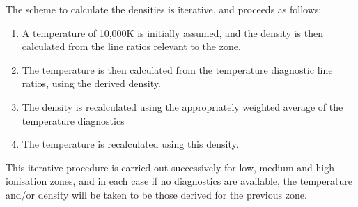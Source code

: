 \documentclass[useAMS,usenatbib]{mn2e}
\begin{document}
The scheme to calculate the densities is iterative, and proceeds as follows:

\begin{enumerate}
\item A temperature of 10,000K is initially assumed, and the density is then calculated from the line ratios relevant to the zone.
\item The temperature is then calculated from the temperature diagnostic line ratios, using the derived density.
\item The density is recalculated using the appropriately weighted average of the temperature diagnostics
\item The temperature is recalculated using this density.
\end{enumerate}

This iterative procedure is carried out successively for low, medium and high ionisation zones, and in each case if no diagnostics are available, the temperature and/or density will be taken to be those derived for the previous zone.
\end{document}
